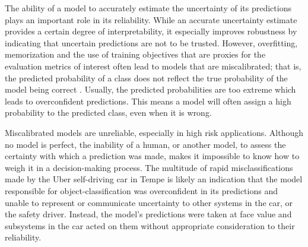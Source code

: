 The ability of a model to accurately estimate the uncertainty of its predictions plays an important role in its reliability. 
While an accurate uncertainty estimate provides a certain degree of interpretability, it especially improves robustness by indicating that uncertain predictions are not to be trusted. 
However, overfitting, memorization and the use of training objectives that are proxies for the evaluation metrics of interest often lead to models that are miscalibrated; that is, the predicted probability of a class does not reflect the true probability of the model being correct \parencite{guo_calibration_2017, kull_temperature_2019}. 
Usually, the predicted probabilities are too extreme which leads to overconfident predictions. This means a model will often assign a high probability to the predicted class, even when it is wrong. 

Miscalibrated models are unreliable, especially in high risk applications. Although no model is perfect, the inability of a human, or another model, to assess the certainty with which a prediction was made, makes it impossible to know how to weigh it in a decision-making process. 
The multitude of rapid misclassifications made by the Uber self-driving car in Tempe is likely an indication that the model responsible for object-classification was overconfident in its predictions and unable to represent or communicate uncertainty to other systems in the car, or the safety driver. Instead, the model's predictions were taken at face value and subsystems in the car acted on them without appropriate consideration to their reliability.


